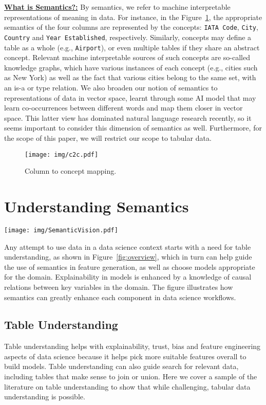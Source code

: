 \documentclass[sigconf]{acmart}
\newcommand{\topic}[1]{\noindent \underline{ \bf #1}}
\begin{document}
\topic{What is Semantics?:}
By semantics, we refer to machine interpretable representations of meaning in data. For instance, in the Figure~\ref{fig:c2c}, the appropriate semantics of the four columns are represented by the concepts: \texttt{IATA Code}, \texttt{City}, \texttt{Country} and \texttt{Year Established}, respectively. Similarly, concepts may define a table as a whole (e.g., \texttt{Airport}), or even multiple tables if they share an abstract concept. Relevant machine interpretable sources of such concepts are so-called knowledge graphs, which have various instances of each concept (e.g., cities such as New York) as well as the fact that various cities belong to the same set, with an is-a or type relation.  We also broaden our notion of semantics to representations of data in vector space, learnt through some AI model that may learn co-occurrences between different words and map them closer in vector space.  This latter view has dominated natural language research recently, so it seems important to consider this dimension of semantics as well.  Furthermore, for the scope of this paper, we will restrict our scope to tabular data.

\begin{figure}
    \centering
    \texttt{[image: img/c2c.pdf]}
    \caption{Column to concept mapping.}
    \label{fig:c2c}
\end{figure}

\section{Understanding Semantics}
\begin{figure*}
    \centering   \texttt{[image: img/SemanticVision.pdf]}
    \caption{Semantics in a data science pipeline.}
    \label{fig:overview}
\end{figure*}
\label{data_section}
Any attempt to use data in a data science context starts with a need for table understanding, as shown in Figure~\ref{fig:overview}, which in turn can help guide the use of semantics in feature generation, as well as choose models appropriate for the domain.  Explainability in models is enhanced by a knowledge of causal relations between key variables in the domain.  The figure illustrates how semantics can greatly enhance each component in data science workflows. 

\subsection{Table Understanding}
\label{tabular_data_section}
Table understanding helps with explainability, trust, bias and feature engineering aspects of data science because it helps pick more suitable features overall to build models. 
 Table understanding can also guide search for relevant data, including tables that make sense to join or union.   Here we cover a sample of the literature on table understanding to show that while challenging, tabular data understanding is possible.
\end{document}
